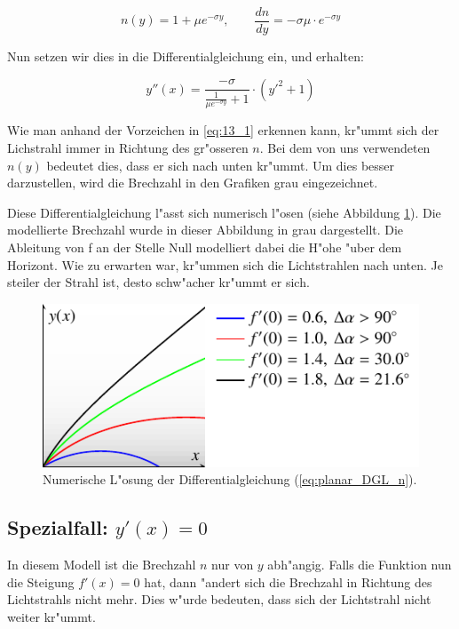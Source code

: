\begin{refsection}
$$n(y) = 1 + \mu e^{- \sigma y}, \qquad \frac{dn}{dy} = -\sigma \mu \cdot e^{-\sigma y}$$

Nun setzen wir dies in die Differentialgleichung ein, und erhalten:

\begin{equation} \label{eq:planar_DGL_n}
y''(x) = \frac{-\sigma}{\displaystyle\frac{1}{\mu e^{-\sigma y}} + 1} \cdot \left( y'^2 + 1 \right)
\end{equation}

Wie man anhand der Vorzeichen in \ref{eq:13_1} erkennen kann, kr"ummt sich der Lichstrahl immer in Richtung des gr"osseren $n$.
Bei dem von uns verwendeten $n(y)$ bedeutet dies, dass er sich nach unten kr"ummt. 
Um dies besser darzustellen, wird die Brechzahl in den Grafiken grau eingezeichnet.

Diese Differentialgleichung l"asst sich numerisch l"osen (siehe Abbildung \ref{fig:planares_modell1}).
Die modellierte Brechzahl wurde in dieser Abbildung in grau dargestellt. 
Die Ableitung von f an der Stelle Null modelliert dabei die H"ohe "uber dem Horizont.
Wie zu erwarten war, kr"ummen sich die Lichtstrahlen nach unten.
Je steiler der Strahl ist, desto schw"acher kr"ummt er sich. 

\begin{figure}
  \centering
  \includegraphics{licht/standalone/fig_planar_simulation.pdf}
  \caption{Numerische L"osung der Differentialgleichung (\ref{eq:planar_DGL_n}). \label{fig:planares_modell1}}
\end{figure}

\subsection{Spezialfall: $y'(x) = 0$} \label{ch:spezialfall}

In diesem Modell ist die Brechzahl $n$ nur von $y$ abh"angig. 
Falls die Funktion nun die Steigung $f'(x) = 0$ hat, dann "andert sich die Brechzahl in Richtung des Lichtstrahls nicht mehr.
Dies w"urde bedeuten, dass sich der Lichtstrahl nicht weiter kr"ummt. 


\end{refsection}
